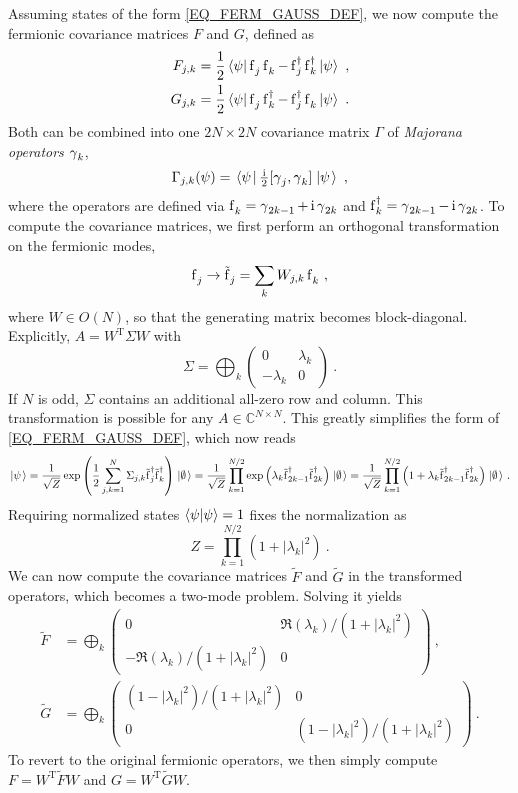 \documentclass[letter]{article}
\begin{document}
Assuming states of the form \eqref{EQ_FERM_GAUSS_DEF}, we now compute the fermionic covariance matrices $F$ and $G$, defined as
\begin{align}
F_{j,k} = \frac{1}{2}\sandwich{\psi}{\fe_j \fe_k - \fd_j \fd_k}{\psi} \ , \\
G_{j,k} = \frac{1}{2}\sandwich{\psi}{\fe_j \fd_k - \fd_j \fe_k}{\psi} \ .
\end{align}
Both can be combined into one $2N \times 2N$ covariance matrix $\Gamma$ of \emph{Majorana operators} $\operatorname{\gamma}_k$,
\begin{equation}
\Gamma_{j,k}(\psi) =\left.\left\langle{\psi}\right.\right|\tfrac{\,\mathrm{i}\,}{2} [\operatorname{\gamma}_j,\operatorname{\gamma}_k]\left.\left|{\psi}\right.\right\rangle \ ,
\end{equation}
where the operators are defined via $\fe_k = \m_{2k-1} + \i \m_{2k}$ and  $\operatorname{f}^\dagger_k = \operatorname{\gamma}_{2k-1} - \,\mathrm{i} \operatorname{\gamma}_{2k}$.
To compute the covariance matrices, we first perform an orthogonal transformation on the fermionic modes,
\begin{equation}
\fe_j \to \ft_j = \sum_k W_{j,k} \fe_k \ ,
\end{equation} 
where $W \in O(N)$, so that the generating matrix becomes block-diagonal. Explicitly, $A = W^\mathrm{T} \Sigma W$ with
\begin{equation}
\Sigma = 
\bigoplus_k
\begin{pmatrix}
0 & \lambda_k \\
-\lambda_k & 0
\end{pmatrix}\ .
\end{equation}
If $N$ is odd, $\Sigma$ contains an additional all-zero row and column.
This transformation is possible for any $A \in \mathbb{C}^{N \times N}$. This greatly simplifies the form of \eqref{EQ_FERM_GAUSS_DEF}, which now reads
\begin{equation}
\left.\left|{\psi}\right.\right\rangle = \frac{1}{\sqrt{Z}} \exp\left( \frac{1}{2} \sum_{j,k=1}^N \Sigma_{j,k} \tilde{\operatorname{f}}^\dagger_j \tilde{\operatorname{f}}^\dagger_k \right) {\left.\left|{\emptyset}\right.\right\rangle} 
= \frac{1}{\sqrt{Z}} \prod_{k=1}^{N/2} \exp\left(\lambda_k \tilde{\operatorname{f}}^\dagger_{2k-1} \tilde{\operatorname{f}}^\dagger_{2k}\right) {\left.\left|{\emptyset}\right.\right\rangle}
= \frac{1}{\sqrt{Z}} \prod_{k=1}^{N/2} \left(1 + \lambda_k \tilde{\operatorname{f}}^\dagger_{2k-1} \tilde{\operatorname{f}}^\dagger_{2k}\right) {\left.\left|{\emptyset}\right.\right\rangle}
\ .
\end{equation}
Requiring normalized states $\left\langle \psi \middle| \psi \right\rangle = 1$ fixes the normalization as
\begin{equation}
Z = \prod_{k=1}^{N/2} \left(1 + |\lambda_k|^2\right)\ .
\end{equation}
We can now compute the covariance matrices $\tilde{F}$ and $\tilde{G}$ in the transformed operators, which becomes a two-mode problem. Solving it yields
\begin{align}
\tilde{F} &= 
\bigoplus_k
\begin{pmatrix}
0 & \Re(\lambda_k)/(1 + |\lambda_k|^2) \\
-\Re(\lambda_k)/(1 + |\lambda_k|^2) & 0
\end{pmatrix}\ , \\
\tilde{G} &= 
\bigoplus_k
\begin{pmatrix}
(1 - |\lambda_k|^2)/(1 + |\lambda_k|^2) & 0 \\
0 & (1 - |\lambda_k|^2)/(1 + |\lambda_k|^2)
\end{pmatrix}\ .
\end{align}
To revert to the original fermionic operators, we then simply compute $F=W^\mathrm{T} \tilde{F} W$ and $G=W^\mathrm{T} \tilde{G} W$.
\end{document}
